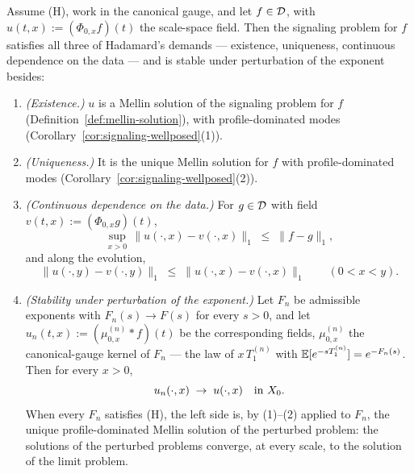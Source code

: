 \begin{corollary}\label{cor:signaling-hadamard}
Assume (H), work in the canonical gauge, and let $f \in \mathcal{D}$, with
$u(t,x) := (\Phi_{0,x}f)(t)$ the scale-space field. Then the signaling problem for $f$
satisfies all three of Hadamard's demands --- existence, uniqueness, continuous dependence
on the data --- and is stable under perturbation of the exponent besides:
\begin{enumerate}
\item \emph{(Existence.)} $u$ is a Mellin solution of the signaling problem for $f$
(Definition~\ref{def:mellin-solution}), with profile-dominated modes (Corollary~\ref{cor:signaling-wellposed}(1)).
\item \emph{(Uniqueness.)} It is the unique Mellin solution for $f$ with profile-dominated
modes (Corollary~\ref{cor:signaling-wellposed}(2)).
\item \emph{(Continuous dependence on the data.)} For $g \in \mathcal{D}$ with field
$v(t,x) := (\Phi_{0,x}g)(t)$,
\[
  \sup_{x>0}\,\|u(\cdot,x) - v(\cdot,x)\|_1 \;\le\; \|f - g\|_1,
\]
and along the evolution,
\[
  \|u(\cdot,y) - v(\cdot,y)\|_1 \;\le\; \|u(\cdot,x) - v(\cdot,x)\|_1 \qquad (0 < x < y).
\]
\item \emph{(Stability under perturbation of the exponent.)} Let $F_n$ be admissible
exponents with $F_n(s) \to F(s)$ for every $s > 0$, and let
$u_n(t,x) := (\mu^{(n)}_{0,x} * f)(t)$ be the corresponding fields, $\mu^{(n)}_{0,x}$ the
canonical-gauge kernel of $F_n$ --- the law of $x\,T^{(n)}_1$ with
$\mathbb{E}[e^{-sT^{(n)}_1}] = e^{-F_n(s)}$. Then for every $x > 0$,
\[
  u_n(\cdot, x) \;\to\; u(\cdot, x) \quad\text{in } X_0 .
\]
When every $F_n$ satisfies (H), the left side is, by (1)--(2) applied to $F_n$, the unique
profile-dominated Mellin solution of the perturbed problem: the solutions of the perturbed
problems converge, at every scale, to the solution of the limit problem.
\end{enumerate}
\end{corollary}

